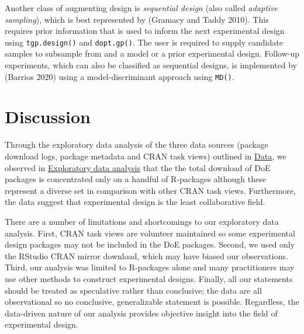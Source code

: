 Another class of augmenting design is \emph{sequential design} (also called \emph{adaptive sampling}), which is best represented by  (Gramacy and Taddy 2010). This requires prior information that is used to inform the next experimental design using \texttt{tgp.design()} and \texttt{dopt.gp()}. The user is required to supply candidate samples to subsample from and a model or a prior experimental design. Follow-up experiments, which can also be classified as sequential designs, is implemented by  (Barrios 2020) using a model-discriminant approach using \texttt{MD()}.

\hypertarget{discussion}{%
\section{Discussion}\label{discussion}}

Through the exploratory data analysis of the three data sources (package download logs, package metadata and CRAN task views) outlined in \hyperref[data]{Data}, we observed in \hyperref[eda]{Exploratory data analysis} that the the total download of DoE packages is concentrated only on a handful of R-packages although these represent a diverse set in comparison with other CRAN task views. Furthermore, the data suggest that experimental design is the least collaborative field.

There are a number of limitations and shortcomings to our exploratory data analysis. First, CRAN task views are volunteer maintained so some experimental design packages may not be included in the DoE packages. Second, we used only the RStudio CRAN mirror download, which may have biased our observations. Third, our analysis was limited to R-packages alone and many practitioners may use other methods to construct experimental designs. Finally, all our statements should be treated as speculative rather than conclusive; the data are all observational so no conclusive, generalizable statement is possible. Regardless, the data-driven nature of our analysis provides objective insight into the field of experimental design.

